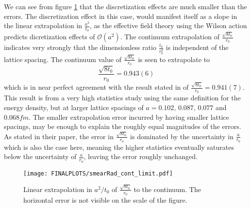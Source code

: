 \documentclass[a4paper,10pt]{book}
\begin{document}
We can see from figure \ref{fig:SmearRad_v_latticeConstant} that the discretization effects are much smaller than the errors. The discretization effect in this case, would manifest itself as a slope in the linear extrapolation in $\frac{a^2}{t_0}$, as the effective field theory using the Wilson action predicts dicretization effects of $\mathcal{O}(a^2)$. The continuum extrapolation of $\frac{\sqrt{8t_0}}{r_0}$ indicates very strongly that the dimensionless ratio $\frac{t_0}{r_0^2}$ is independent of the lattice spacing. The continuum value of $\frac{\sqrt{8t_0}}{r_0}$ is seen to extrapolate to
\begin{equation}
\frac{\sqrt{8t_0}}{r_0} = 0.943(6)
\end{equation}
which is in near perfect agreement with the result stated in \cite{non_gaussianities2015} of $\frac{\sqrt{8t_0}}{r_0} = 0.941(7)$. This result is from a very high statistics study using the same definition for the energy density, but at larger lattice spacings of $a = 0.102,\,0.087,\,0.077$ and $0.068fm$. The smaller extrapolation error incurred by having smaller lattice spacings, may be enough to explain the roughly equal magnitudes of the errors. As stated in their paper, the error in $\frac{\sqrt{8t_0}}{r_0}$ is dominated by the uncertainty in $\frac{a}{r_0}$ which is also the case here, meaning the higher statistics eventually saturates below the uncertainty of $\frac{a}{r_0}$, leaving the error roughly unchanged.
\begin{figure}[htbp]
\centering
\texttt{[image: FINALPLOTS/smearRad\_cont\_limit.pdf]}
\caption[]{Linear extrapolation in $a^2/t_0$ of $\frac{\sqrt{8t_0}}{r_0}$ to the continuum. The horizontal error is not visible on the scale of the figure.}\label{fig:SmearRad_v_latticeConstant}
\end{figure}
\end{document}
